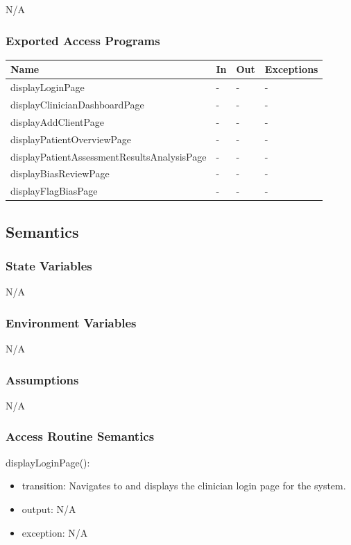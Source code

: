 \documentclass[12pt, titlepage]{article}
\begin{document}
N/A

\subsubsection{Exported Access Programs}

\begin{center}
\begin{tabular}{p{8cm} p{2cm} p{2cm} p{2cm}}
\hline
\textbf{Name} & \textbf{In} & \textbf{Out} & \textbf{Exceptions} \\
\hline
displayLoginPage & - & - & - \\
displayClinicianDashboardPage & - & - & - \\
displayAddClientPage & - & - & - \\
displayPatientOverviewPage & - & - & - \\
displayPatientAssessmentResultsAnalysisPage & - & - & - \\
displayBiasReviewPage & - & - & - \\
displayFlagBiasPage & - & - & - \\
\hline
\end{tabular}
\end{center}

\subsection{Semantics}

\subsubsection{State Variables}
N/A

\subsubsection{Environment Variables}
N/A

\subsubsection{Assumptions}
N/A

\subsubsection{Access Routine Semantics}

\noindent displayLoginPage():
\begin{itemize}
\item transition: Navigates to and displays the clinician login page for the system.
\item output: N/A
\item exception: N/A
\end{itemize}
\end{document}
